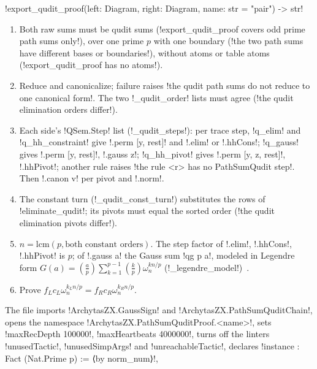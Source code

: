 {{{\begin{signature}
\lexpy!export_qudit_proof(left: Diagram, right: Diagram, name: str = "pair") -> str!
\end{signature}
\begin{algorithm}\label{alg:lean-export-qudit-proof}
\begin{enumerate}
\item Both raw sums must be qudit sums (\lexcode!export_qudit_proof covers odd prime path sums only!), over one prime $p$ with one boundary (\lexcode!the two path sums have different bases or boundaries!), without atoms or table atoms (\lexcode!export_qudit_proof has no atoms!).
\item Reduce and canonicalize; failure raises \lexcode!the qudit path sums do not reduce to one canonical form!. The two \lexpy!_qudit_order! lists must agree (\lexcode!the qudit elimination orders differ!).
\item Each side's \lexlean!QSem.Step! list (\lexpy!_qudit_steps!): per trace step, \lexcode!q_elim! and
\lexcode!q_hh_constraint! give \lexlean!.perm [y, rest]! and \lexlean!.elim! or \lexlean!.hhCons!;
\lexcode!q_gauss! gives \lexlean!.perm [y, rest]!, \lexlean!.gauss z!; \lexcode!q_hh_pivot! gives
\lexlean!.perm [y, z, rest]!, \lexlean!.hhPivot!; another rule raises \lexcode!the rule <r> has no PathSumQudit step!. Then \lexlean!.canon v! per pivot and \lexlean!.norm!.
\item The constant turn (\lexpy!_qudit_const_turn!) substitutes the rows of \lexpy!eliminate_qudit!;
its pivots must equal the sorted order (\lexcode!the qudit elimination pivots differ!).
\item $n = \mathrm{lcm}(p, \text{both constant orders})$. The step factor of \lexlean!.elim!,
\lexlean!.hhCons!, \lexlean!.hhPivot! is $p$; of \lexlean!.gauss a! the Gauss sum
\lexlean!qg p a!, modeled in Legendre form
$G(a) = \left(\frac{a}{p}\right)\sum_{k=1}^{p-1}\left(\frac{k}{p}\right)\omega_n^{kn/p}$
(\lexpy!_legendre_model!)~\cite{berndt1998gauss}.
\item Prove $f_L c_L\omega_n^{k_L n/p} = f_R c_R \omega_n^{k_R n/p}$.
\end{enumerate}
\end{algorithm}
The file imports \lexlean!ArchytasZX.GaussSign! and \lexlean!ArchytasZX.PathSumQuditChain!, opens
the namespace \lexlean!ArchytasZX.PathSumQuditProof.<name>!, sets \lexcode!maxRecDepth 100000!,
\lexcode!maxHeartbeats 4000000!, turns off the linters \lexcode!unusedTactic!,
\lexcode!unusedSimpArgs! and \lexcode!unreachableTactic!, declares \lexlean!instance : Fact (Nat.Prime p) := ⟨by norm_num⟩!,
}}}
